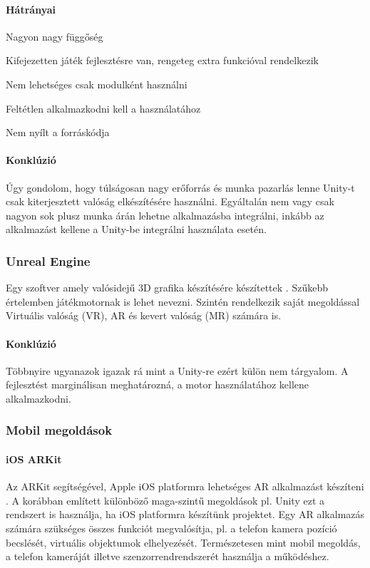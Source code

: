 \documentclass[12pt,a4paper,oneside]{report} %
\begin{document}
\paragraph{Hátrányai} 
\begin{compactitem}
	\item Nagyon nagy függőség
	\item Kifejezetten játék fejlesztésre van, rengeteg extra funkcióval rendelkezik
	\item Nem lehetséges csak modulként használni
	\item Feltétlen alkalmazkodni kell a használatához
	\item Nem nyílt a forráskódja
\end{compactitem}
\paragraph{Konklúzió}
Úgy gondolom, hogy túlságosan nagy erőforrás és munka pazarlás lenne Unity-t csak kiterjesztett valóság elkészítésére használni. Egyáltalán nem vagy csak nagyon sok plusz munka árán lehetne alkalmazásba integrálni, inkább az alkalmazást kellene a Unity-be integrálni használata esetén.

\subsubsection{Unreal Engine}
Egy szoftver amely valósidejű 3D grafika készítésére készítettek \cite{unrealengine}. Szűkebb értelemben játékmotornak is lehet  nevezni. Szintén rendelkezik saját megoldással Virtuális valóság (VR), AR és kevert valóság (MR) számára is.
\paragraph{Konklúzió} Többnyire ugyanazok igazak rá mint a Unity-re ezért külön nem tárgyalom. A fejlesztést marginálisan meghatározná, a motor használatához kellene alkalmazkodni.
\subsubsection{Mobil megoldások}
\paragraph{iOS ARKit}
Az ARKit segítségével, Apple iOS platformra lehetséges AR alkalmazást készíteni \cite{arkit}. A korábban említett különböző maga-szintű megoldások pl. Unity ezt a rendszert is használja, ha iOS platformra készítünk projektet. Egy AR alkalmazás számára szükséges összes funkciót megvalósítja, pl. a telefon kamera pozíció becslését, virtuális objektumok elhelyezését. Természetesen mint mobil megoldás, a telefon kameráját illetve szenzorrendrendszerét használja a működéshez.
\end{document}

